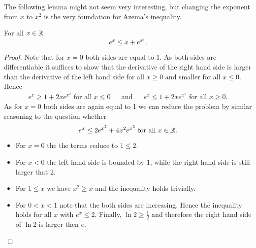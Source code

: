 
The following lemma might not seem very interesting, but changing the exponent from $x$ to $x^2$ is the very foundation for Azema's inequality.
\begin{lemma} For all $x\in\mathbb{R}$
\[e^{x}\leq x+e^{x^2}.\]
\end{lemma} 
\begin{proof}
Note that for $x=0$ both sides are equal to 1. As both sides are differentiable it suffices to show that the derivative of the right hand side is larger than the derivative of the left hand side for all $x\geq0$ and smaller for all $x\leq0$. Hence
\begin{align*}
e^x\geq 1+2xe^{x^2}\text{ for all $x\leq 0$} &&\text{and}&& e^x\leq 1+2xe^{x^2}\text{ for all $x\geq 0$}.
\end{align*}
As for $x=0$ both sides are again equal to 1 we can reduce the problem by similar reasoning to the question whether
\[e^x\leq 2e^{x^2}+4x^2e^{x^2}\text{ for all $x\in\mathbb{R}$}.\]

\begin{itemize}
\item For $x=0$ the the terms reduce to $1\leq2$.
\item For $x<0$ the left hand side is bounded by 1, while the right hand side is still larger that 2.
\item For $1\leq x$ we have $x^2\geq x$ and the inequality holds trivially.
\item For $0< x< 1$ note that the both sides are increasing. Hence the inequality holds for all $x$ with $e^x\leq 2$. Finally, $\ln2\geq\frac{1}{2}$ and therefore the right hand side of $\ln2$ is larger then $e$.  
\end{itemize}
\end{proof}


